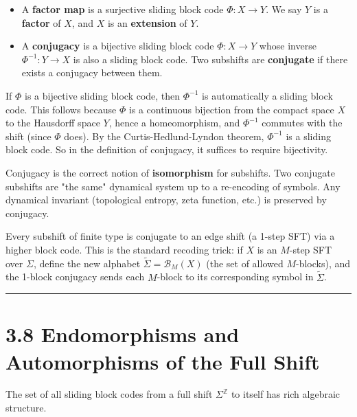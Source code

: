 \begin{itemize}
  \item A \textbf{factor map} is a surjective sliding block code $\Phi: X \to Y$. We say $Y$ is a \textbf{factor} of $X$, and $X$ is an \textbf{extension} of $Y$.
\end{itemize}

\begin{itemize}
  \item A \textbf{conjugacy} is a bijective sliding block code $\Phi: X \to Y$ whose inverse $\Phi^{-1}: Y \to X$ is also a sliding block code. Two subshifts are \textbf{conjugate} if there exists a conjugacy between them.
\end{itemize}

\begin{remark}
If $\Phi$ is a bijective sliding block code, then $\Phi^{-1}$ is automatically a sliding block code. This follows because $\Phi$ is a continuous bijection from the compact space $X$ to the Hausdorff space $Y$, hence a homeomorphism, and $\Phi^{-1}$ commutes with the shift (since $\Phi$ does). By the Curtis-Hedlund-Lyndon theorem, $\Phi^{-1}$ is a sliding block code. So in the definition of conjugacy, it suffices to require bijectivity.

Conjugacy is the correct notion of \textbf{isomorphism} for subshifts. Two conjugate subshifts are "the same" dynamical system up to a re-encoding of symbols. Any dynamical invariant (topological entropy, zeta function, etc.) is preserved by conjugacy.
\end{remark}

\begin{example}
Every subshift of finite type is conjugate to an edge shift (a 1-step SFT) via a higher block code. This is the standard recoding trick: if $X$ is an $M$-step SFT over $\Sigma$, define the new alphabet $\tilde{\Sigma} = \mathcal{B}_M(X)$ (the set of allowed $M$-blocks), and the 1-block conjugacy sends each $M$-block to its corresponding symbol in $\tilde{\Sigma}$.

\bigskip\hrule\bigskip
\end{example}

\section{3.8 Endomorphisms and Automorphisms of the Full Shift}

The set of all sliding block codes from a full shift $\Sigma^\mathbb{Z}$ to itself has rich algebraic structure.

